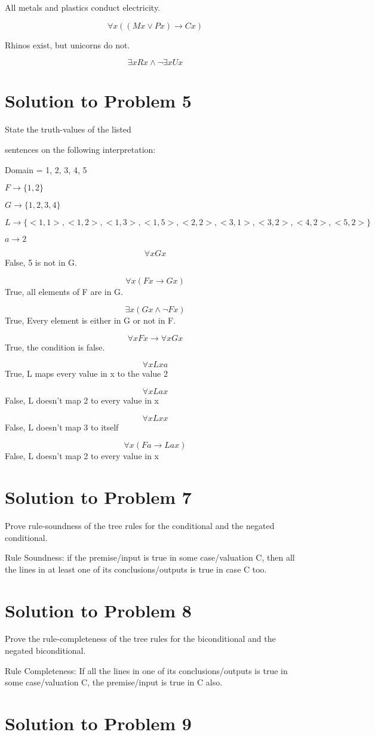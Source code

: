 \documentclass[12pt]{article}
\begin{document}
All metals and plastics conduct electricity.

\[ \forall x ((Mx \lor Px) \rightarrow Cx) \]

Rhinos exist, but unicorns do not.

\[ \exists x Rx \land \neg \exists x Ux \]

\section*{Solution to Problem 5}

State the truth-values of the listed

sentences on the following interpretation:

Domain = {1, 2, 3, 4, 5}


$F \rightarrow \{1, 2\}$

$G \rightarrow \{1, 2, 3, 4\}$

$L \rightarrow \{<1,1>, <1,2>, <1,3>, <1, 5>, <2, 2>, <3, 1>, <3,2>,<4, 2>, <5, 2>\}$

$a \rightarrow 2$

\[ \forall x Gx \]
False, 5 is not in G.

\[ \forall x(Fx \rightarrow Gx) \]
True, all elements of F are in G.

\[ \exists x(Gx \land \lnot Fx) \]
True, Every element is either in G or not in F.

\[ \forall x F x \rightarrow \forall x G x \]
True, the condition is false. 

\[ \forall x Lxa \]
True, L maps every value in x to the value 2

\[ \forall x Lax \]
False, L doesn't map 2 to every value in x

\[ \forall x Lxx \]
False, L doesn't map 3 to itself

\[ \forall x(Fa \rightarrow Lax) \]
False, L doesn't map 2 to every value in x


\section*{Solution to Problem 7}

Prove rule-soundness of the tree rules for the conditional and the negated conditional.

Rule Soundness: if the premise/input is true in some case/valuation C, then all the lines in at least
one of its conclusions/outputs is true in case C too.




\section*{Solution to Problem 8}
 Prove the rule-completeness of the tree rules for the biconditional and the negated biconditional.  
 
Rule Completeness:  If all the lines in one of its conclusions/outputs  is true in some case/valuation 
C, the premise/input is true in C also.



\section*{Solution to Problem 9}
\end{document}
